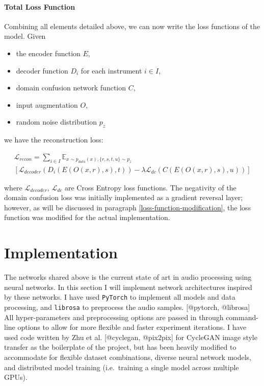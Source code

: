 \documentclass[12pt,a4paper,]{report}
\providecommand{\tightlist}{%
  \setlength{\itemsep}{0pt}\setlength{\parskip}{0pt}}
\begin{document}
\hypertarget{total-loss-function}{%
\subsubsection{Total Loss Function}\label{total-loss-function}}

Combining all elements detailed above, we can now write the loss
functions of the model. Given

\begin{itemize}
\tightlist
\item
  the encoder function \(E\),
\item
  decoder function \(D_i\) for each instrument \(i \in I\),
\item
  domain confusion network function \(C\),
\item
  input augmentation \(O\),
\item
  random noise distribution \(p_z\)
\end{itemize}

we have the reconstruction loss:

\begin{multline}
    \mathcal{L}_{recon} = \sum_{i \in I} \mathbb{E}_{x \sim p_{data}(x), \{r, s, t, u\} \sim p_{z}} \\
    [\mathcal{L}_{decoder}(D_i(E(O(x, r), s), t))  - \lambda \mathcal{L}_{dc}(C(E(O(x, r), s), u))] \label{eq:umtn}
\end{multline}

where \(\mathcal{L}_{decoder}\), \(\mathcal{L}_{dc}\) are Cross Entropy
loss functions. The negativity of the domain confusion loss was
initially implemented as a gradient reversal layer; however, as will be
discussed in paragraph \ref{loss-function-modification}, the loss
function was modified for the actual implementation.

\hypertarget{implementation}{%
\chapter{Implementation}\label{implementation}}

The networks shared above is the current state of art in audio
processing using neural networks. In this section I will implement
network architectures inspired by these networks. I have used
\texttt{PyTorch} to implement all models and data processing, and
\texttt{librosa} to preprocess the audio samples. {[}@pytorch,
@librosa{]} All hyper-parameters and preprocessing options are passed in
through command-line options to allow for more flexible and faster
experiment iterations. I have used code written by Zhu et al.
{[}@cyclegan, @pix2pix{]} for CycleGAN image style transfer as the
boilerplate of the project, but has been heavily modified to accommodate
for flexible dataset combinations, diverse neural network models, and
distributed model training (i.e.~training a single model across multiple
GPUs).
\end{document}
